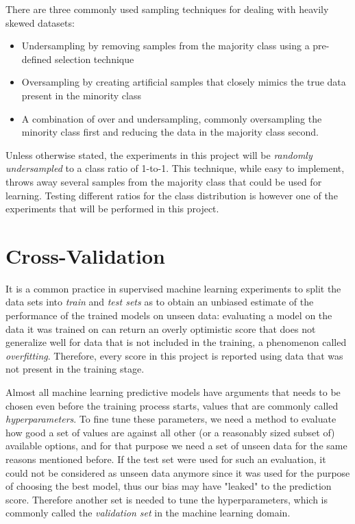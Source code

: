\documentclass{kththesis}
\begin{document}
There are three commonly used sampling techniques for dealing with heavily skewed datasets: 

\begin{itemize}
\item Undersampling by removing samples from the majority class using a pre-defined selection technique
\item Oversampling by creating artificial samples that closely mimics the true data present in the minority class
\item A combination of over and undersampling, commonly oversampling the minority class first and reducing the data in the majority class second.
\end{itemize}

Unless otherwise stated, the experiments in this project will be \emph{randomly undersampled} to a class ratio of 1-to-1. This technique, while easy to implement, throws away several samples from the majority class that could be used for learning. Testing different ratios for the class distribution is however one of the experiments that will be performed in this project. 

\section{Cross-Validation}

It is a common  practice in supervised machine learning experiments to split the data sets into \emph{train} and \emph{test sets} as to obtain an unbiased estimate of the performance of the trained models on unseen data: evaluating a model on the data it was trained on can return an overly optimistic score that does not generalize well for data that is not included in the training, a phenomenon called \emph{overfitting}. Therefore, every score in this project is reported using data that was not present in the training stage.

Almost all machine learning predictive models have arguments that needs to be chosen even before the training process starts, values that are commonly called \emph{hyperparameters}. To fine tune these parameters, we need a method to evaluate how good a set of values are against all other (or a reasonably sized subset of) available options, and for that purpose we need a set of unseen data for the same reasons mentioned before. If the test set were used for such an evaluation, it could not be considered as unseen data anymore since it was used for the purpose of choosing the best model, thus our bias may have "leaked" to the prediction score. Therefore another set is needed to tune the hyperparameters, which is commonly called the \emph{validation set} in the machine learning domain.
\end{document}
